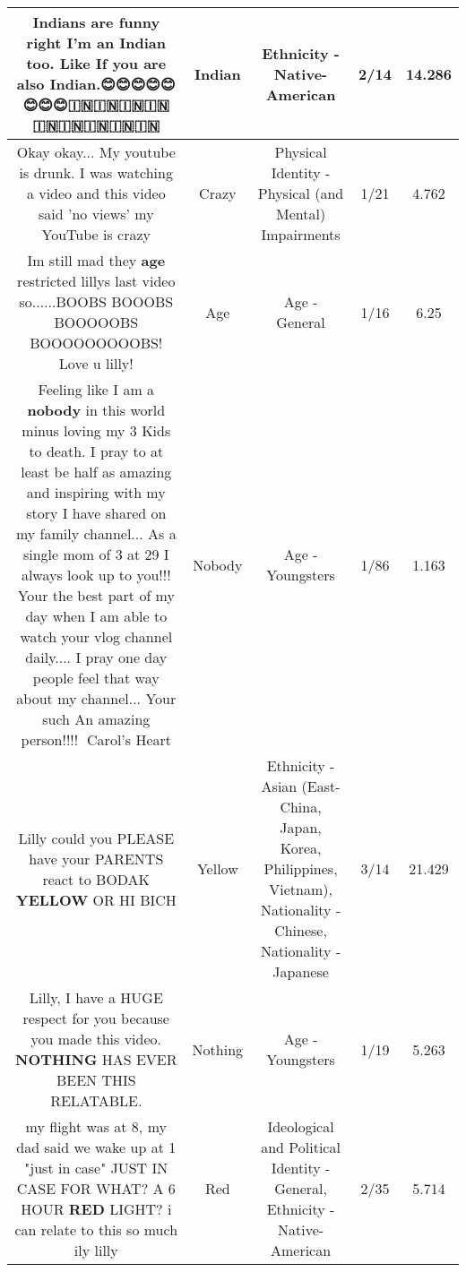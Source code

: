 \documentclass[11pt]{article}
\newlength\mylength
\begin{document}
\begin{center}
\begin{longtable}{|C{.65\mylength}|C{.30\mylength}|C{.12\mylength}|C{.12\mylength}|C{.12\mylength}|}
  \small Indians are funny right I'm an \textbf{Indian} too. Like If you are also \textbf{Indian}.😊😊😊😊😊😊😊😊🇮🇳🇮🇳🇮🇳🇮🇳🇮🇳🇮🇳🇮🇳🇮🇳🇮🇳\normalsize   & Indian & Ethnicity - Native-American & 2/14 & 14.286 \\  \hline
  \small Okay okay... My youtube is drunk. I was watching a video and this video said 'no views' my YouTube is crazy\normalsize   & Crazy & Physical Identity - Physical (and Mental) Impairments & 1/21 & 4.762 \\  \hline
  \small Im still mad they \textbf{age} restricted  lillys last video so......BOOBS BOOOBS BOOOOOBS BOOOOOOOOOBS! Love u lilly!\normalsize   & Age & Age - General & 1/16 & 6.25 \\  \hline
  \small Feeling like I am a \textbf{nobody} in this world minus loving my 3 Kids to death. I pray to at least be half as amazing and inspiring with my story I have shared on my family channel... As a single mom of 3 at 29 I always look up to you!!! Your the best part of my day when I am able to watch your vlog channel daily.... I pray one day people feel that way about my channel... Your such An amazing person!!!! 💜Carol's Heart\normalsize   & Nobody & Age - Youngsters & 1/86 & 1.163 \\  \hline
  \small Lilly could you PLEASE have your PARENTS react to BODAK \textbf{Y\textbf{E\textbf{LLOW}}} OR HI BICH\normalsize   & Yellow & Ethnicity - Asian (East- China, Japan, Korea, Philippines, Vietnam), Nationality - Chinese, Nationality - Japanese & 3/14 & 21.429 \\  \hline
  \small Lilly, I have a HUGE respect for you because you made this video. \textbf{NOTHING} HAS EVER BEEN THIS RELATABLE.\normalsize   & Nothing & Age - Youngsters & 1/19 & 5.263 \\  \hline
  \small my flight was at 8, my dad said we wake up at 1 "just in case" JUST IN CASE FOR WHAT? A 6 HOUR \textbf{R\textbf{ED}} LIGHT? i can relate to this so much ily lilly\normalsize   & Red &  Ideological and Political Identity - General, Ethnicity - Native-American & 2/35 & 5.714 \\  \hline

\end{longtable}
\end{center}
\end{document}
